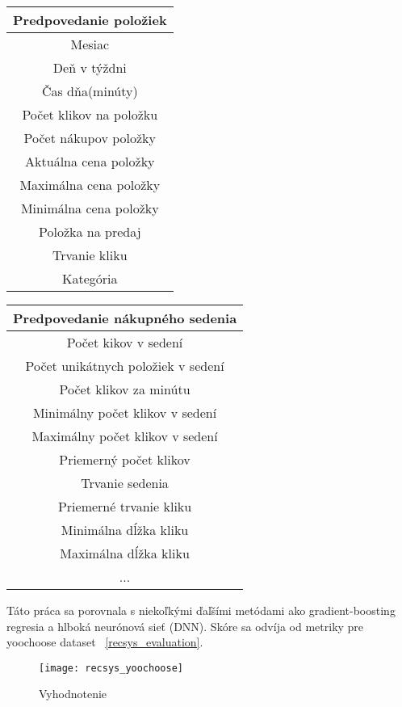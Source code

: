 \parbox{.45\linewidth}{

	\begin{tabular}{||c||} 
		\hline
		Predpovedanie položiek  \\ [0.5ex] 
		\hline\hline
		Mesiac  \\ 
		\hline
		Deň v týždni  \\
		\hline
		Čas dňa(minúty) \\
		\hline
		Počet klikov na položku \\
		\hline
		Počet nákupov položky  \\ 
		\hline
		Aktuálna cena položky  \\
		\hline
		Maximálna cena položky \\
		\hline
		Minimálna cena položky \\
		\hline
		Položka na predaj \\
		\hline
		Trvanie kliku \\
		\hline
		Kategória \\ [1ex] 
		\hline
	\end{tabular}
}
\parbox{.45\linewidth}{
	\begin{tabular}{||c||} 
		\hline
		Predpovedanie nákupného sedenia  \\ [0.5ex] 
		\hline\hline
		Počet kikov v sedení  \\ 
		\hline
		Počet unikátnych položiek v sedení  \\
		\hline
		Počet klikov za minútu \\
		\hline
		Minimálny počet klikov v sedení \\
		\hline
		Maximálny počet klikov v sedení  \\ 
		\hline
		Priemerný počet klikov \\
		\hline
		Trvanie sedenia \\
		\hline
		Priemerné trvanie kliku\\
		\hline
		Minimálna dĺžka kliku \\
		\hline
		Maximálna dĺžka kliku \\
		\hline
		... \\ [1ex] 
		\hline
	\end{tabular}
}

Táto práca sa porovnala s niekoľkými ďaľšími metódami ako gradient-boosting regresia a hlboká neurónová sieť (DNN). Skóre sa odvíja od metriky pre yoochoose dataset ~\ref{recsys_evaluation}.

\begin{figure}[H]
	\begin{center}
		\texttt{[image: recsys\_yoochoose]}\end{center}
	\caption[pixelmap]{Vyhodnotenie}
	\label{fig:evaluation}
\end{figure}


